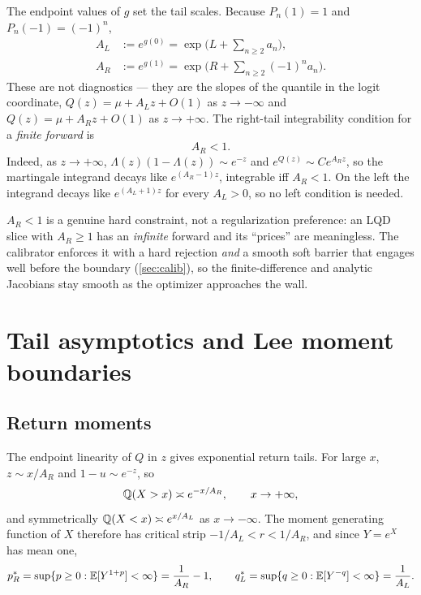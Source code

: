 \documentclass[11pt]{article}
\begin{document}
The endpoint values of $g$ set the tail scales. Because $P_n(1)=1$ and
$P_n(-1)=(-1)^n$,
\begin{align}
A_L&:=e^{g(0)}=\exp\!\Big(L+\textstyle\sum_{n\ge2}a_n\Big),
\label{eq:AL}\\
A_R&:=e^{g(1)}=\exp\!\Big(R+\textstyle\sum_{n\ge2}(-1)^na_n\Big).
\label{eq:AR}
\end{align}
These are not diagnostics --- they are the slopes of the quantile in the logit
coordinate, $Q(z)=\mu+A_Lz+O(1)$ as $z\to-\infty$ and $Q(z)=\mu+A_Rz+O(1)$ as
$z\to+\infty$. The right-tail integrability condition for a \emph{finite forward}
is
\begin{equation}
A_R<1.
\label{eq:AR_condition}
\end{equation}
Indeed, as $z\to+\infty$, $\Lambda(z)(1-\Lambda(z))\sim e^{-z}$ and
$e^{Q(z)}\sim Ce^{A_Rz}$, so the martingale integrand decays like $e^{(A_R-1)z}$,
integrable iff $A_R<1$. On the left the integrand decays like $e^{(A_L+1)z}$ for
every $A_L>0$, so no left condition is needed.

\begin{caution}
$A_R<1$ is a genuine hard constraint, not a regularization preference: an LQD
slice with $A_R\ge1$ has an \emph{infinite} forward and its ``prices'' are
meaningless. The calibrator enforces it with a hard rejection \emph{and} a smooth
soft barrier that engages well before the boundary (\cref{sec:calib}), so the
finite-difference and analytic Jacobians stay smooth as the optimizer approaches
the wall.
\end{caution}

\section{Tail asymptotics and Lee moment boundaries}
\label{sec:tails}

\subsection{Return moments}

The endpoint linearity of $Q$ in $z$ gives exponential return tails. For large
$x$, $z\sim x/A_R$ and $1-u\sim e^{-z}$, so
\begin{equation}
\mathbb{Q}(X>x)\asymp e^{-x/A_R},\qquad x\to+\infty,
\end{equation}
and symmetrically $\mathbb{Q}(X<x)\asymp e^{x/A_L}$ as $x\to-\infty$. The moment
generating function of $X$ therefore has critical strip
$-1/A_L<r<1/A_R$, and since $Y=e^X$ has mean one,
\begin{equation}
p_R^*=\sup\{p\ge0:\mathbb{E}[Y^{1+p}]<\infty\}=\frac{1}{A_R}-1,
\qquad
q_L^*=\sup\{q\ge0:\mathbb{E}[Y^{-q}]<\infty\}=\frac{1}{A_L}.
\label{eq:critical}
\end{equation}
\end{document}
